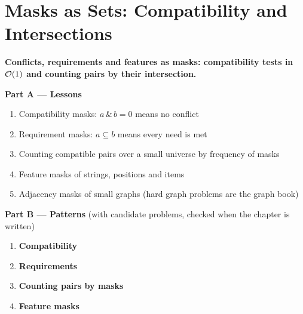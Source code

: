 \chapter{Masks as Sets: Compatibility and Intersections}
\label{ch:masks_sets}

\begin{tcolorbox}[enhanced, colback=white, colframe=secondaryblue, boxrule=1pt, arc=2mm]
\textbf{\large\textcolor{primaryblue}{Conflicts, requirements and features as masks: compatibility tests in $\mathcal{O}(1)$ and counting pairs by their intersection.}}
\end{tcolorbox}


\begin{plannedbox}
\textbf{Part A --- Lessons}
\begin{enumerate}[leftmargin=*, label=\textbf{A\arabic*.}, itemsep=1pt]
    \item Compatibility masks: $a \,\&\, b = 0$ means no conflict
    \item Requirement masks: $a \subseteq b$ means every need is met
    \item Counting compatible pairs over a small universe by frequency of masks
    \item Feature masks of strings, positions and items
    \item Adjacency masks of small graphs (hard graph problems are the graph book)
\end{enumerate}
\textbf{Part B --- Patterns} (with candidate problems, checked when the chapter is written)
\begin{enumerate}[leftmargin=*, label=\textbf{P\arabic*.}, itemsep=1pt]
    \item \textbf{Compatibility}
    \item \textbf{Requirements}
    \item \textbf{Counting pairs by masks}
    \item \textbf{Feature masks}
\end{enumerate}
\end{plannedbox}
